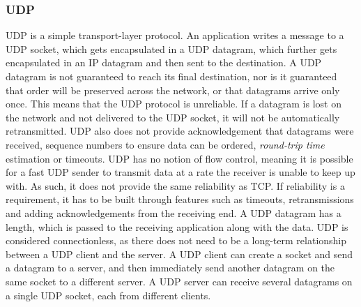\subsubsection{UDP}
UDP is a simple transport-layer protocol\cite{socketnetworking}.
An application writes a message to a UDP socket, which gets encapsulated in a UDP datagram, which further gets encapsulated in an IP datagram and then sent to the destination.
A UDP datagram is not guaranteed to reach its final destination, nor is it guaranteed that order will be preserved across the network, or that datagrams arrive only once.
This means that the UDP protocol is unreliable.
If a datagram is lost on the network and not delivered to the UDP socket, it will not be automatically retransmitted.
UDP also does not provide acknowledgement that datagrams were received, sequence numbers to ensure data can be ordered, \textit{round-trip time} estimation or timeouts.
UDP has no notion of flow control, meaning it is possible for a fast UDP sender to transmit data at a rate the receiver is unable to keep up with.
As such, it does not provide the same reliability as TCP.
If reliability is a requirement, it has to be built through features such as timeouts, retransmissions and adding acknowledgements from the receiving end.
A UDP datagram has a length, which is passed to the receiving application along with the data.
UDP is considered connectionless, as there does not need to be a long-term relationship between a UDP client and the server.
A UDP client can create a socket and send a datagram to a server, and then immediately send another datagram on the same socket to a different server.
A UDP server can receive several datagrams on a single UDP socket, each from different clients.


